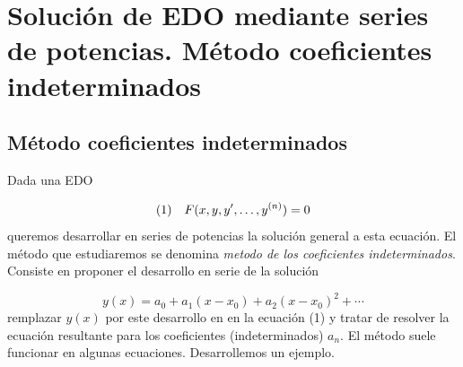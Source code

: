 \section{Solución de EDO mediante series de potencias. Método coeficientes indeterminados}



\subsection{Método coeficientes indeterminados}

Dada una EDO

\begin{equation} \hbox{(1)}\quad  F(x,y,y',\ldots,y^{(n)})=0\end{equation}
queremos desarrollar en series de potencias  la solución general a esta ecuación. El método que estudiaremos se denomina \emph{metodo de los coeficientes indeterminados}. Consiste en proponer el desarrollo en serie de la solución

\[y(x)=a_0+a_1(x-x_0)+a_2(x-x_0)^2+\cdots  \]
remplazar $y(x)$ por este desarrollo en  en la ecuación (1) y tratar de resolver la ecuación resultante para los coeficientes (indeterminados) $a_n$. El método suele funcionar en algunas ecuaciones. Desarrollemos un ejemplo.



